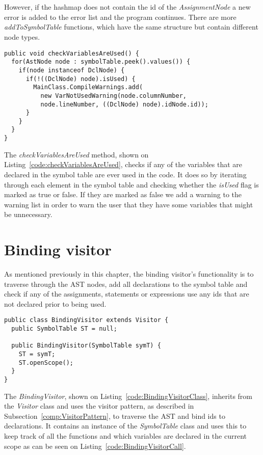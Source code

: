 \\\\
However, if the hashmap does not contain the id of the \textit{AssignmentNode} a new error is added to the error list and the program continues.
There are more \textit{addToSymbolTable} functions, which have the same structure but contain different node types. 
\begin{lstlisting}[caption={Code to check if variables are used}, label={code:checkVariablesAreUsed}]
public void checkVariablesAreUsed() {
  for(AstNode node : symbolTable.peek().values()) {
    if(node instanceof DclNode) {
      if(!((DclNode) node).isUsed) {
        MainClass.CompileWarnings.add(
          new VarNotUsedWarning(node.columnNumber, 
          node.lineNumber, ((DclNode) node).idNode.id));
      }
    }
  } 
}
\end{lstlisting}
The \textit{checkVariablesAreUsed} method, shown on Listing~\ref{code:checkVariablesAreUsed}, checks if any of the variables that are declared in the symbol table are ever used in the code. 
It does so by iterating through each element in the symbol table and checking whether the \textit{isUsed} flag is marked as true or false. 
If they are marked as false we add a warning to the warning list in order to warn the user that they have some variables that might be unnecessary.

\section{Binding visitor}
As mentioned previously in this chapter, the binding visitor's functionality is to traverse through the AST nodes, add all declarations to the symbol table and check if any of the assignments, statements or expressions use any ids that are not declared prior to being used.
\begin{lstlisting}[caption={Code for the binding visitor}, label={code:BindingVisitorClass}]
public class BindingVisitor extends Visitor {
  public SymbolTable ST = null;
	
  public BindingVisitor(SymbolTable symT) {
    ST = symT;
    ST.openScope();
  }
}
\end{lstlisting}
The \textit{BindingVisitor}, shown on Listing~\ref{code:BindingVisitorClass}, inherits from the \textit{Visitor} class and uses the visitor pattern, as described in Subsection~\ref{comp:VisitorPattern}, to traverse the AST and bind ids to declarations. It contains an instance of the \textit{SymbolTable} class and uses this to keep track of all the functions and which variables are declared in the current scope as can be seen on Listing~\ref{code:BindingVisitorCall}.

